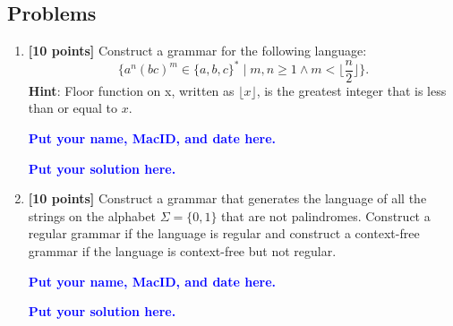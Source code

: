 \documentclass[11pt,fleqn]{article}
\newcommand{\be}{\begin{enumerate}}
\newcommand{\ee}{\end{enumerate}}
\begin{document}
\newpage

\subsection*{Problems}

\be

  \item \textbf{[10 points]} Construct a grammar for the following
    language: $$\Big\{a^n(bc)^m \in \{a,b,c\}^* \mid m,n \ge 1 \wedge
    m < \lfloor\frac{n}{2}\rfloor\Big\}.$$
	\textbf{Hint}: Floor function on x, written as $\lfloor x\rfloor$, is the greatest integer that is less than or equal to $x$.
	

  \bigskip

  \textcolor{blue}{\textbf{Put your name, MacID, and date here.}}

  \textcolor{blue}{\textbf{Put your solution here.}}

  \bigskip

  \item \textbf{[10 points]} Construct a grammar that generates the
    language of all the strings on the alphabet $\Sigma = \{0,1\}$
    that are not palindromes.  Construct a regular grammar if the
    language is regular and construct a context-free grammar if the
    language is context-free but not regular.
  


  \bigskip

  \textcolor{blue}{\textbf{Put your name, MacID, and date here.}}

  \textcolor{blue}{\textbf{Put your solution here.}}




\ee
\end{document}
